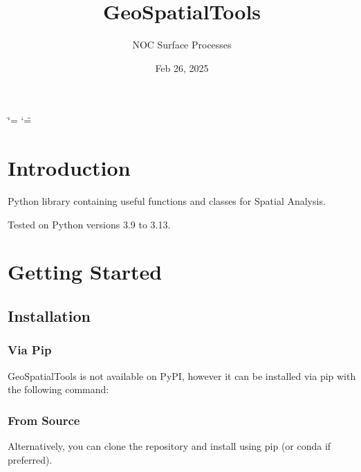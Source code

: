 \documentclass[letterpaper,10pt,english]{sphinxmanual}
\title{GeoSpatialTools}
\date{Feb 26, 2025}
\author{NOC Surface Processes}
\begin{document}
\ifdefined\shorthandoff
  \ifnum\catcode`\=\string=\active\shorthandoff{=}\fi
  \ifnum\catcode`\"=\active{}\fi
\fi

\pagestyle{empty}
\sphinxmaketitle
\pagestyle{plain}
\sphinxtableofcontents
\pagestyle{normal}
\label{\detokenize{index::doc}}


\sphinxstepscope


\chapter{Introduction}
\label{\detokenize{introduction:introduction}}\label{\detokenize{introduction::doc}}
\sphinxAtStartPar
Python library containing useful functions and classes for Spatial Analysis.

\sphinxAtStartPar
Tested on Python versions 3.9 to 3.13.

\sphinxstepscope


\chapter{Getting Started}
\label{\detokenize{getting_started:getting-started}}\label{\detokenize{getting_started::doc}}

\section{Installation}
\label{\detokenize{getting_started:installation}}

\subsection{Via Pip}
\label{\detokenize{getting_started:via-pip}}
\sphinxAtStartPar
GeoSpatialTools is not available on PyPI, however it can be installed via pip with the following command:

\begin{sphinxVerbatim}[commandchars=\\\{\}]
\end{sphinxVerbatim}


\subsection{From Source}
\label{\detokenize{getting_started:from-source}}
\sphinxAtStartPar
Alternatively, you can clone the repository and install using pip (or conda if preferred).
\end{document}
